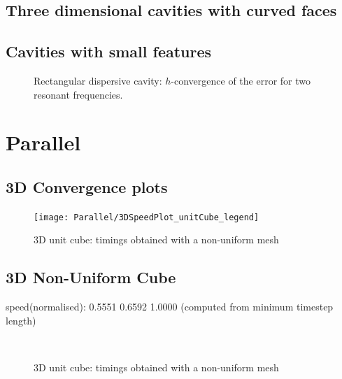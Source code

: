 \clearpage
\subsection{Three dimensional cavities with curved faces}

\clearpage
\subsection{Cavities with small features}
\begin{figure}[!ht]
	\centering
{}
	\caption{Rectangular dispersive cavity: $h$-convergence of the error for two resonant frequencies.}
	\label{fig:rectangle2Ddispersive_Convergence}
\end{figure}
\section{Parallel}
\subsection{3D Convergence plots}
\begin{figure}[!ht]
	\centering
  \texttt{[image: Parallel/3DSpeedPlot\_unitCube\_legend]}
	\caption{3D unit cube: timings obtained with a non-uniform mesh}
	\label{fig:unitCubeNonUniformTimings}
\end{figure}
\clearpage
\subsection{3D Non-Uniform Cube}
speed(normalised): 0.5551    0.6592    1.0000
(computed from minimum timestep length)
\begin{figure}[!ht]
	\centering
   \\
	\caption{3D unit cube: timings obtained with a non-uniform mesh}
	\label{fig:unitCubeNonUniformTimings}
\end{figure}

